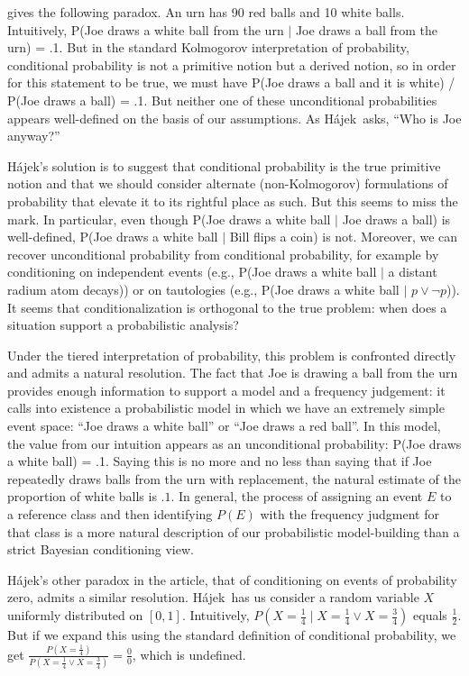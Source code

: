 \documentclass[letterpaper,12pt]{article}
\newcommand{\hajek}{H\'ajek}
\begin{document}
\cite{DBLP:journals/synthese/Hajek07} gives the following paradox. An urn has 90 red balls and 10 white balls. Intuitively, P(Joe draws a white ball from the urn $\mid$ Joe draws a ball from the urn) = .1. But in the standard Kolmogorov interpretation of probability, conditional probability is not a primitive notion but a derived notion, so in order for this statement to be true, we must have P(Joe draws a ball and it is white) / P(Joe draws a ball) = .1. But neither one of these unconditional probabilities appears well-defined on the basis of our assumptions. As \hajek\ asks, ``Who is Joe anyway?''

\hajek's solution is to suggest that conditional probability is the true primitive notion and that we should consider alternate (non-Kolmogorov) formulations of probability that elevate it to its rightful place as such. But this seems to miss the mark. In particular, even though P(Joe draws a white ball $\mid$ Joe draws a ball) is well-defined, P(Joe draws a white ball $\mid$ Bill flips a coin) is not. Moreover, we can recover unconditional probability from conditional probability, for example by conditioning on independent events (e.g., P(Joe draws a white ball $\mid$ a distant radium atom decays)) or on tautologies (e.g., P(Joe draws a white ball $\mid$ $p \lor \neg p$)). It seems that conditionalization is orthogonal to the true problem: when does a situation support a probabilistic analysis?

Under the tiered interpretation of probability, this problem is confronted directly and admits a natural resolution. The fact that Joe is drawing a ball from the urn provides enough information to support a model and a frequency judgement: it calls into existence a probabilistic model in which we have an extremely simple event space: ``Joe draws a white ball'' or ``Joe draws a red ball''. In this model, the value from our intuition appears as an unconditional probability: P(Joe draws a white ball) = .1. Saying this is no more and no less than saying that if Joe repeatedly draws balls from the urn with replacement, the natural estimate of the proportion of white balls is $.1$. In general, the process of assigning an event $E$ to a reference class and then identifying $P(E)$ with the frequency judgment for that class is a more natural description of our probabilistic model-building than a strict Bayesian conditioning view.

\hajek's other paradox in the article, that of conditioning on events of probability zero, admits a similar resolution. \hajek\ has us consider a random variable $X$ uniformly distributed on $[0, 1]$. Intuitively, $P(X = \frac{1}{4} \mid X = \frac{1}{4} \lor X = \frac{3}{4})$ equals $\frac{1}{2}$. But if we expand this using the standard definition of conditional probability, we get $\frac{P(X = \frac{1}{4})}{P(X = \frac{1}{4} \lor X = \frac{3}{4})} = \frac{0}{0}$, which is undefined.
\end{document}
